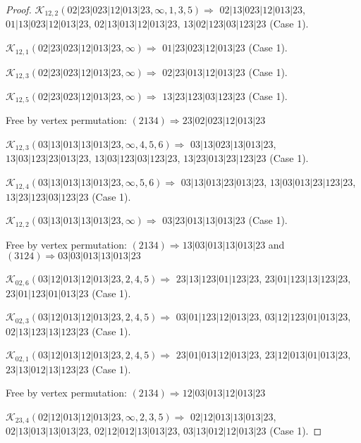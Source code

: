 \documentclass[12pt]{article}
\theoremstyle{plain}
\theoremstyle{definition}
\theoremstyle{remark}
\newcommand{\fancy}[1]{\mathcal{#1}}
\def\K{\fancy{K}}
\begin{document}
\begin{proof}
	
	\bigskip
	
	$\K_{12,2}(02|23|023|12|013|23,\infty,1, 3, 5)\Rightarrow $ $02|13|023|12|013|23$, $01|13|023|12|013|23$, $02|13|013|12|013|23$, $13|02|123|03|123|23$ (Case 1).
	
	$\K_{12,1}(02|23|023|12|013|23,\infty)\Rightarrow $ $01|23|023|12|013|23$ (Case 1).
	
	$\K_{12,3}(02|23|023|12|013|23,\infty)\Rightarrow $ $02|23|013|12|013|23$ (Case 1).
	
	$\K_{12,5}(02|23|023|12|013|23,\infty)\Rightarrow $ $13|23|123|03|123|23$ (Case 1).
	
	
	
	Free by vertex permutation: $(2 1 3 4)\Rightarrow 23|02|023|12|013|23$
	
	
	
	\bigskip
	
	$\K_{12,3}(03|13|013|13|013|23,\infty,4, 5, 6)\Rightarrow $ $03|13|023|13|013|23$, $13|03|123|23|013|23$, $13|03|123|03|123|23$, $13|23|013|23|123|23$ (Case 1).
	
	$\K_{12,4}(03|13|013|13|013|23,\infty,5, 6)\Rightarrow $ $03|13|013|23|013|23$, $13|03|013|23|123|23$, $13|23|123|03|123|23$ (Case 1).
	
	$\K_{12,2}(03|13|013|13|013|23,\infty)\Rightarrow $ $03|23|013|13|013|23$ (Case 1).
	
	
	
	Free by vertex permutation: $(2 1 3 4)\Rightarrow 13|03|013|13|013|23$ and $(3 1 2 4)\Rightarrow 03|03|013|13|013|23$
	
	
	
	\bigskip
	
	$\K_{02,6}(03|12|013|12|013|23,2, 4, 5)\Rightarrow $ $23|13|123|01|123|23$, $23|01|123|13|123|23$, $23|01|123|01|013|23$ (Case 1).
	
	$\K_{02,3}(03|12|013|12|013|23,2, 4, 5)\Rightarrow $ $03|01|123|12|013|23$, $03|12|123|01|013|23$, $02|13|123|13|123|23$ (Case 1).
	
	$\K_{02,1}(03|12|013|12|013|23,2, 4, 5)\Rightarrow $ $23|01|013|12|013|23$, $23|12|013|01|013|23$, $23|13|012|13|123|23$ (Case 1).
	
	
	
	Free by vertex permutation: $(2 1 3 4)\Rightarrow 12|03|013|12|013|23$
	
	
	
	\bigskip
	
	$\K_{23,4}(02|12|013|12|013|23,\infty,2, 3, 5)\Rightarrow $ $02|12|013|13|013|23$, $02|13|013|13|013|23$, $02|12|012|13|013|23$, $03|13|012|12|013|23$ (Case 1).
	

\end{proof}
\end{document}
